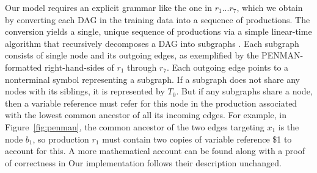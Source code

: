 \documentclass[11pt,a4paper]{article}
\theoremstyle{plain}
\begin{document}
Our model requires an explicit grammar like the one in $r_1...r_7$, which we obtain by converting each DAG in the training data into a sequence of productions. The conversion yields a single, unique sequence of productions via a simple linear-time algorithm that recursively decomposes a DAG into subgraphs \citep{bjorklund2016between}. Each subgraph consists of single node and its outgoing edges, as exemplified by the PENMAN-formatted right-hand-sides of $r_1$ through $r_7$.
Each outgoing edge points to a nonterminal symbol representing a subgraph. If a subgraph does not share any nodes with its siblings, it is represented by $T_0$. But if any subgraphs share a node, then a variable reference must refer for this node in the production associated with the lowest common ancestor of all its incoming edges. For example, in
Figure~\ref{fig:penman}, the common ancestor of the two edges targeting
$x_1$ is the node $b_1$, so production $r_1$ must contain two copies of variable 
reference \$1 to account for this. A more mathematical account
can be found along with a proof of correctness in \citet{bjorklund2016between} 
Our implementation follows their description unchanged.
\end{document}
